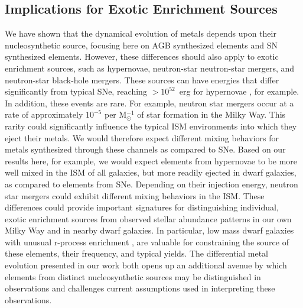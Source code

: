 \documentclass[twocolumn]{aastex61}
\begin{document}
\subsection{Implications for Exotic Enrichment Sources}
\label{sec:exotic enrichment}
We have shown that the dynamical evolution of metals depends upon their nucleosynthetic source, focusing here on AGB synthesized elements and SN synthesized elements. However, these differences should also apply to exotic enrichment sources, such as hypernovae, neutron-star neutron-star mergers, and neutron-star black-hole mergers. These sources can have energies that differ significantly from typical SNe, reaching $> 10^{52}$~erg for hypernovae \citep{Nomoto2004}, for example. In addition, 
     these events are rare.  For example, neutron star mergers occur 
     at a rate of approximately $10^{-5}$ per M$_{\odot}^{-1}$ of star
     formation in the Milky Way\citep{Kim2015}.  This rarity could 
significantly influence the typical ISM environments into which they eject their metals. We would therefore expect different mixing behaviors for metals synthesized through these channels as compared to SNe. Based on our results here, 
     for example,
we would expect elements from hypernovae to be more well mixed in the ISM of all galaxies, but more readily ejected in dwarf galaxies, as compared to elements from SNe. 
Depending on their injection energy, neutron star mergers could exhibit different mixing behaviors in the ISM. These differences could provide important signatures for distinguishing individual, exotic enrichment sources from observed stellar abundance patterns in our own Milky Way and in nearby dwarf galaxies. In particular, low mass dwarf galaxies with unusual r-process enrichment \citep[e.g.][]{Ji2016}, are valuable for constraining the source of these elements, their frequency, and typical yields. The differential metal evolution presented in our work both opens up an additional avenue by which elements from distinct nucleosynthetic sources may be distinguished in observations and challenges current assumptions used in interpreting these observations.
\end{document}
